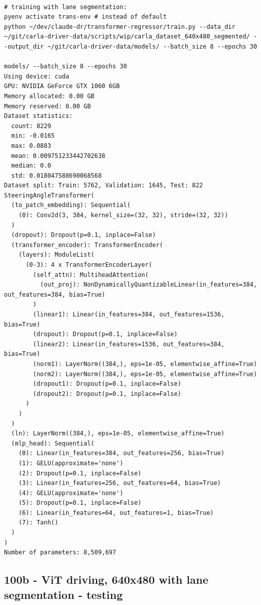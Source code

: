 \begin{verbatim}

# training with lane segmentation:
pyenv activate trans-env # instead of default 
python ~/dev/claude-dr/transformer-regressor/train.py --data_dir ~/git/carla-driver-data/scripts/wip/carla_dataset_640x480_segmented/ --output_dir ~/git/carla-driver-data/models/ --batch_size 8 --epochs 30

models/ --batch_size 8 --epochs 30
Using device: cuda
GPU: NVIDIA GeForce GTX 1060 6GB
Memory allocated: 0.00 GB
Memory reserved: 0.00 GB
Dataset statistics:
  count: 8229
  min: -0.0165
  max: 0.0883
  mean: 0.009751233442702638
  median: 0.0
  std: 0.018047588690068568
Dataset split: Train: 5762, Validation: 1645, Test: 822
SteeringAngleTransformer(
  (to_patch_embedding): Sequential(
    (0): Conv2d(3, 384, kernel_size=(32, 32), stride=(32, 32))
  )
  (dropout): Dropout(p=0.1, inplace=False)
  (transformer_encoder): TransformerEncoder(
    (layers): ModuleList(
      (0-3): 4 x TransformerEncoderLayer(
        (self_attn): MultiheadAttention(
          (out_proj): NonDynamicallyQuantizableLinear(in_features=384, out_features=384, bias=True)
        )
        (linear1): Linear(in_features=384, out_features=1536, bias=True)
        (dropout): Dropout(p=0.1, inplace=False)
        (linear2): Linear(in_features=1536, out_features=384, bias=True)
        (norm1): LayerNorm((384,), eps=1e-05, elementwise_affine=True)
        (norm2): LayerNorm((384,), eps=1e-05, elementwise_affine=True)
        (dropout1): Dropout(p=0.1, inplace=False)
        (dropout2): Dropout(p=0.1, inplace=False)
      )
    )
  )
  (ln): LayerNorm((384,), eps=1e-05, elementwise_affine=True)
  (mlp_head): Sequential(
    (0): Linear(in_features=384, out_features=256, bias=True)
    (1): GELU(approximate='none')
    (2): Dropout(p=0.1, inplace=False)
    (3): Linear(in_features=256, out_features=64, bias=True)
    (4): GELU(approximate='none')
    (5): Dropout(p=0.1, inplace=False)
    (6): Linear(in_features=64, out_features=1, bias=True)
    (7): Tanh()
  )
)
Number of parameters: 8,509,697

\end{verbatim}

\subsection{100b - ViT driving, 640x480 with lane segmentation - testing}
\label{app_res:100b}

